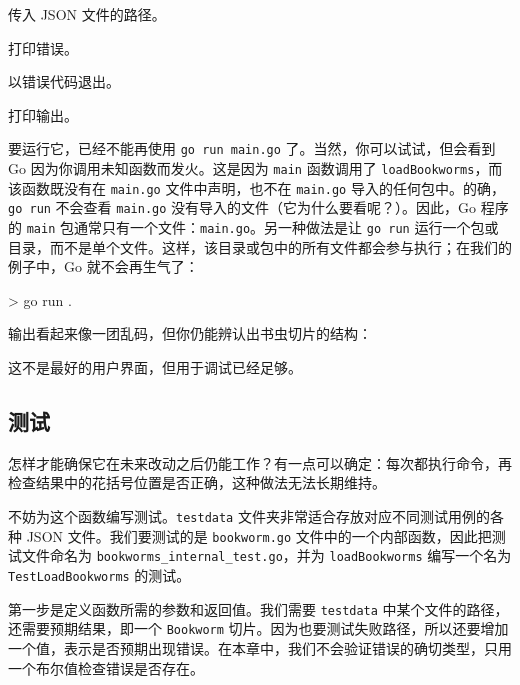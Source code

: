 \begin{codeannotations}
  \item 传入 JSON 文件的路径。
  \item 打印错误。
  \item 以错误代码退出。
  \item 打印输出。
\end{codeannotations}

要运行它，已经不能再使用 \texttt{go run main.go} 了。当然，你可以试试，但会看到 Go 因为你调用未知函数而发火。这是因为 \texttt{main} 函数调用了 \texttt{loadBookworms}，而该函数既没有在 \texttt{main.go} 文件中声明，也不在 \texttt{main.go} 导入的任何包中。的确，\texttt{go run} 不会查看 \texttt{main.go} 没有导入的文件（它为什么要看呢？）。因此，Go 程序的 \texttt{main} 包通常只有一个文件：\texttt{main.go}。另一种做法是让 \texttt{go run} 运行一个包或目录，而不是单个文件。这样，该目录或包中的所有文件都会参与执行；在我们的例子中，Go 就不会再生气了：

\begin{shellcode}[]
> go run .
\end{shellcode}

输出看起来像一团乱码，但你仍能辨认出书虫切片的结构：

\begin{shellcode}
\end{shellcode}

这不是最好的用户界面，但用于调试已经足够。

\subsection{测试}

怎样才能确保它在未来改动之后仍能工作？有一点可以确定：每次都执行命令，再检查结果中的花括号位置是否正确，这种做法无法长期维持。

不妨为这个函数编写测试。\texttt{testdata} 文件夹非常适合存放对应不同测试用例的各种 JSON 文件。我们要测试的是 \texttt{bookworm.go} 文件中的一个内部函数，因此把测试文件命名为 \texttt{bookworms\_internal\_test.go}，并为 \texttt{loadBookworms} 编写一个名为 \texttt{TestLoadBookworms} 的测试。

第一步是定义函数所需的参数和返回值。我们需要 \texttt{testdata} 中某个文件的路径，还需要预期结果，即一个 \texttt{Bookworm} 切片。因为也要测试失败路径，所以还要增加一个值，表示是否预期出现错误。在本章中，我们不会验证错误的确切类型，只用一个布尔值检查错误是否存在。

